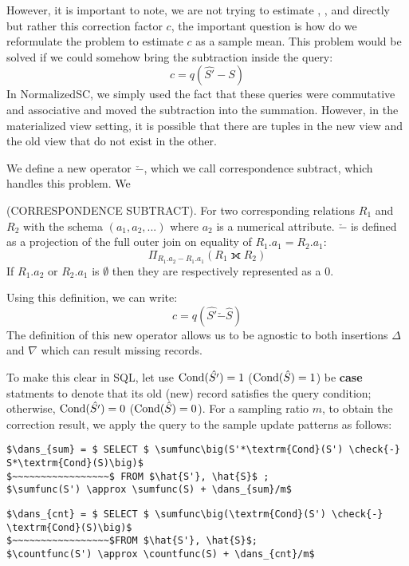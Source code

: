 However, it is important to note, we are not trying to estimate \sumfunc, \countfunc, and \avgfunc directly but rather this correction factor $c$, the important question is how do we reformulate the problem to estimate $c$ as a sample mean.
This problem would be solved if we could somehow bring the subtraction inside the query:
\[ c = q(\hat{S'} - S)\] 
In NormalizedSC, we simply used the fact that these queries were commutative and associative and moved the subtraction into the summation.
However, in the materialized view setting, it is possible that there are tuples in the new view and the old view that do not exist in the other.

We define a new operator $\check{-}$, which we call correspondence subtract, which handles this problem.
We 

\begin{definition} (CORRESPONDENCE SUBTRACT). For two corresponding relations $R_1$ and $R_2$ with the schema $(a_1, a_2, ...)$ where 
$a_2$ is a numerical attribute. $\check{-}$ is defined as a projection of the full outer join on equality of $R_1.a_1 = R_2.a_1$: \[ \Pi_{R_1.a_2 - R_1.a_1} ( R_1 \fullouterjoin R_2 ) \]
 If $R_1.a_2$ or $R_2.a_1$ is $\emptyset$ then they are respectively represented as a $0$.
\end{definition}
Using this definition, we can write:
\[ c = q(\hat{S'} \check{-} \hat{S})\] 
The definition of this new operator allows us to be agnostic to both insertions $\Delta$ and $\nabla$ which can result missing records.

To make this clear in SQL, let use $\textrm{Cond}(\hat{S'})=1$ ($\textrm{Cond}(\hat{S})=1$) be \textbf{case} statments to denote that its old (new) record satisfies the query condition; otherwise, $\textrm{Cond}(\hat{S'})=0$ ($\textrm{Cond}(\hat{S})=0$). 
For a sampling ratio $m$, to obtain the correction result, we apply the query to the sample update patterns as follows:
\begin{lstlisting}[mathescape,basicstyle={\scriptsize}]
$\dans_{sum} = $ SELECT $ \sumfunc\big(S'*\textrm{Cond}(S') \check{-} S*\textrm{Cond}(S)\big)$ 
$~~~~~~~~~~~~~~~~~$ FROM $\hat{S'}, \hat{S}$ ;
$\sumfunc(S') \approx \sumfunc(S) + \dans_{sum}/m$
\end{lstlisting}

\begin{lstlisting}[mathescape,basicstyle={\scriptsize}]
$\dans_{cnt} = $ SELECT $ \sumfunc\big(\textrm{Cond}(S') \check{-} \textrm{Cond}(S)\big)$ 
$~~~~~~~~~~~~~~~~~$FROM $\hat{S'}, \hat{S}$;
$\countfunc(S') \approx \countfunc(S) + \dans_{cnt}/m$
\end{lstlisting}


